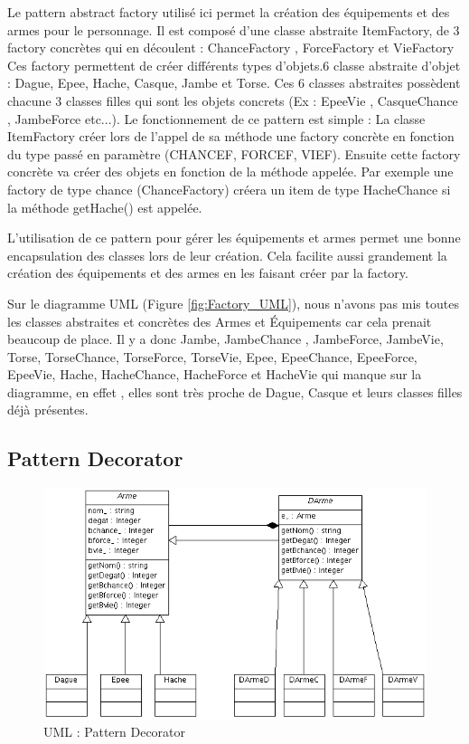 \documentclass[a4paper]{article}
\begin{document}
Le pattern abstract factory utilisé ici permet la création des équipements et des armes pour le personnage.
Il est composé d'une classe abstraite ItemFactory, de 3 factory concrètes qui en découlent : ChanceFactory , ForceFactory et VieFactory
Ces factory permettent de créer différents types d'objets.6 classe abstraite d'objet : Dague, Epee, Hache, Casque, Jambe et Torse.
Ces 6 classes abstraites possèdent chacune 3 classes filles qui sont les objets concrets (Ex : EpeeVie , CasqueChance , JambeForce etc...).
Le fonctionnement de ce pattern est simple : La classe ItemFactory créer lors de l'appel de sa méthode une factory concrète en fonction du type passé en paramètre (CHANCEF, FORCEF, VIEF).
Ensuite cette factory concrète va créer des objets en fonction de la méthode appelée.
Par exemple une factory de type chance (ChanceFactory) créera un item de type HacheChance si la méthode getHache() est appelée.

L'utilisation de ce pattern pour gérer les équipements et armes permet une bonne encapsulation des classes lors de leur création.
Cela facilite aussi grandement la création des équipements et des armes en les faisant créer par la factory.

Sur le diagramme UML (Figure \ref{fig:Factory_UML}), nous n'avons pas mis toutes les classes abstraites et concrètes des Armes et Équipements car cela prenait beaucoup de place.
Il y a donc Jambe, JambeChance , JambeForce, JambeVie, Torse, TorseChance, TorseForce, TorseVie, Epee, EpeeChance, EpeeForce, EpeeVie, Hache, HacheChance, HacheForce et HacheVie qui manque sur la diagramme, en effet , elles sont très proche de Dague, Casque et leurs classes filles déjà présentes.


  \subsection{Pattern Decorator}
    \begin{figure}[h]
      \centering
      \includegraphics[width=15cm]{./Decorator_UML.png}
      \caption{\label{fig:Decorator_UML} UML : Pattern Decorator}
    \end{figure}
\end{document}
